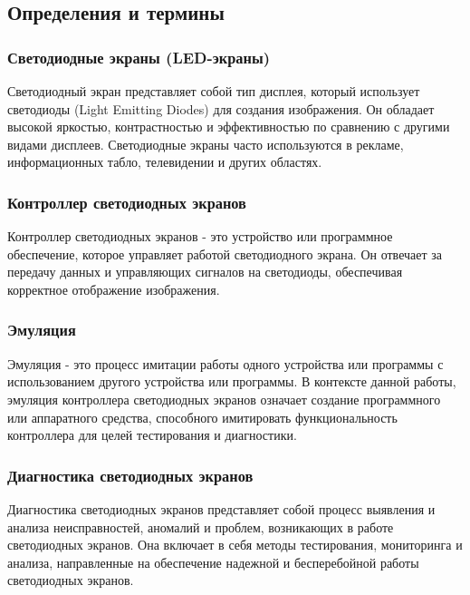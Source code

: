 \subsection{Определения и термины}

\subsubsection{Светодиодные экраны (LED-экраны)}

Светодиодный экран \cite{envoy_docs} представляет собой тип дисплея, который использует светодиоды (Light Emitting Diodes) для создания изображения. Он обладает высокой яркостью, контрастностью и эффективностью по сравнению с другими видами дисплеев. Светодиодные экраны часто используются в рекламе, информационных табло, телевидении и других областях.

\subsubsection{Контроллер светодиодных экранов}

Контроллер светодиодных экранов - это устройство или программное обеспечение, которое управляет работой светодиодного экрана. Он отвечает за передачу данных и управляющих сигналов на светодиоды, обеспечивая корректное отображение изображения.

\subsubsection{Эмуляция}

Эмуляция - это процесс имитации работы одного устройства или программы с использованием другого устройства или программы. В контексте данной работы, эмуляция контроллера светодиодных экранов означает создание программного или аппаратного средства, способного имитировать функциональность контроллера для целей тестирования и диагностики.

\subsubsection{Диагностика светодиодных экранов}

Диагностика светодиодных экранов представляет собой процесс выявления и анализа неисправностей, аномалий и проблем, возникающих в работе светодиодных экранов. Она включает в себя методы тестирования, мониторинга и анализа, направленные на обеспечение надежной и бесперебойной работы светодиодных экранов.


